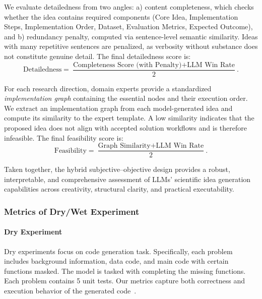 \begin{tcolorbox}[
    breakable,
    title=Metric Definition of Detailedness,
    colback=LighterGray,
    colframe=DeepPurple,
    colbacktitle=DeepPurple,
    coltitle=White
]

We evaluate detailedness from two angles: a) content completeness, which checks whether the idea contains required components (Core Idea, Implementation Steps, Implementation Order, Dataset, Evaluation Metrics, Expected Outcome), and b) redundancy penalty, computed via sentence-level semantic similarity. Ideas with many repetitive sentences are penalized, as verbosity without substance does not constitute genuine detail. The final detailedness score is:
\[
\text{Detailedness} = \frac{\text{Completeness Score (with Penalty)} + \text{LLM Win Rate}}{2}.
\]

\end{tcolorbox}


\begin{tcolorbox}[
    breakable,
    title=Metric Definition of Feasibility,
    colback=LighterGray,
    colframe=DeepPurple,
    colbacktitle=DeepPurple,
    coltitle=White
]

For each research direction, domain experts provide a standardized \textit{implementation graph} containing the essential nodes and their execution order. We extract an implementation graph from each model-generated idea and compute its similarity to the expert template. A low similarity indicates that the proposed idea does not align with accepted solution workflows and is therefore infeasible. The final feasibility score is:
\[
\text{Feasibility} = \frac{\text{Graph Similarity} + \text{LLM Win Rate}}{2}.
\]

\end{tcolorbox}

Taken together, the hybrid subjective--objective design provides a robust, interpretable, and comprehensive assessment of LLMs' scientific idea generation capabilities across creativity, structural clarity, and practical executability.

\subsubsection{Metrics of Dry/Wet Experiment}

\paragraph{Dry Experiment}
\label{sec: Metric of Dry Experiment}
Dry experiments focus on code generation task. Specifically, each problem includes background information, data code, and main code with certain functions masked. The model is tasked with completing the missing functions. Each problem contains 5 unit tests. Our metrics capture both correctness and execution behavior of the generated code~\cite{jain2024livecodebenchholisticcontaminationfree}.

